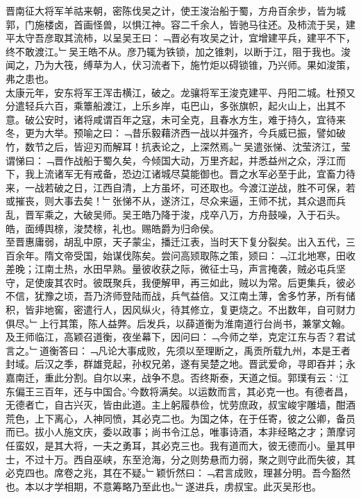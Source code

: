 {{晋南征大将军羊祜来朝，密陈伐吴之计，使王浚治船于蜀，方舟百余步，皆为城郭，门施楼卤，首画怪兽，以惧江神。容二千余人，皆驰马往还。及柿流于吴，建平太守吾彦取其流柿，以呈吴王曰：﹁晋必有攻吴之计，宜增建平兵，建平不下，终不敢渡江。﹂吴王皓不从。彦乃辄为铁锁，加之锥刺，以断于江，阻于我也。浚闻之，乃为大筏，缚草为人，伏习流者下，施竹炬以碍锁锥，乃兴师。果如浚策，弗之患也。\\
太康元年，安东将军王浑击横江，破之。龙骧将军王浚克建平、丹阳二城。杜预又分遣轻兵六百，乘簟船渡江，上乐乡岸，屯巴山，多张旗帜，起火山上，出其不意。破公安时，诸将咸谓百年之寇，未可全克，且春水方生，难于持久，宜待来冬，更为大举。预喻之曰：﹁昔乐毅藉济西一战以并强齐，今兵威已振，譬如破竹，数节之后，皆迎刃而解耳！抗表论之，上深然焉。﹂吴遣张悌、沈莹济江，莹谓悌曰：﹁晋作战船于蜀久矣，今倾国大动，万里齐起，并悉益州之众，浮江而下，我上流诸军无有戒备，恐边江诸城尽莫能御也。晋之水军必至于此，宜畜力待来，一战若破之日，江西自清，上方虽坏，可还取也。今渡江逆战，胜不可保，若或摧丧，则大事去矣！﹂张悌不从，遂济江，尽众来逼，王师不扰，其众退而兵乱，晋军乘之，大破吴师。吴王皓乃降于浚，戍卒八万，方舟鼓噪，入于石头。皓，面缚舆榇，浚焚榇，礼也。赐皓爵为归命侯。}\\
至晋惠庸弱，胡乱中原，天子蒙尘，播迁江表，当时天下复分裂矣。出入五代，三百余年。隋文帝受国，始谋伐陈矣。尝问高颎取陈之策，颎曰：﹁江北地寒，田收差晚；江南土热，水田早熟。量彼收获之际，微征士马，声言掩袭，贼必屯兵坚守，足使废其农时。彼既聚兵，我便解甲，再三如此，贼以为常。后更集兵，彼必不信，犹豫之顷，吾乃济师登陆而战，兵气益倍。又江南土薄，舍多竹茅，所有储积，皆非地窖，密遣行人，因风纵火，待其修立，复更烧之。不出数年，自可财力俱尽。﹂上行其策，陈人益弊。后发兵，以薛道衡为淮南道行台尚书，兼掌文翰。及王师临江，高颖召道衡，夜坐幕下，因问曰：﹁今师之举，克定江东与否？君试言之。﹂道衡答曰：﹁凡论大事成败，先须以至理断之，禹贡所载九州，本是王者封域。后汉之季，群雄竞起，孙权兄弟，遂有吴楚之地。晋武爱命，寻即吞并；永嘉南迁，重此分割。自尔以来，战争不息。否终斯泰，天道之恒。郭璞有云：‘江东偏王三百年，还与中国合。’今数将满矣。以运数而言，其必克一也。有德者昌，无德者亡，自古兴灭，皆由此道。主上躬履恭俭，忧劳庶政，叔宝峻宇雕墙，酣酒荒色，上下离心，人神同愤，其必克二也。为国之体，在于任寄，彼之公卿，备员而已。拔小人施文庆，委以政事；尚书令江总，唯事诗酒，本非经略之才；萧摩诃任蛮奴，是其大将，一夫之勇耳，其必克三也。我有道而大，彼无德而小。量其甲士，不过十万。西自巫峡，东至沧海，分之则势悬而力弱，聚之则守此而失彼，其必克四也。席卷之兆，其在不疑。﹂颖忻然曰：﹁君言成败，理甚分明。吾今豁然也。本以才学相期，不意筹略乃至此也。﹂遂进兵，虏叔宝。此灭吴形也。
\\
}
